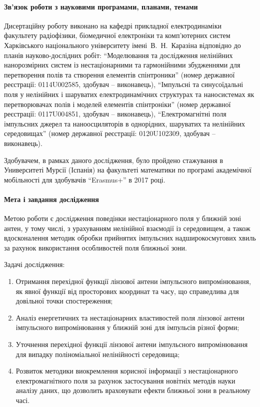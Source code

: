 \paragraph{Зв'язок роботи з науковими програмами, планами, темами}

Дисертаційну роботу виконано на кафедрі прикладної електродинаміки факультету 
радіофізики, біомедичної електроніки та комп’ютерних систем Харківського 
національного університету імені~В.~Н.~Каразіна відповідно до планів 
науково-дослідних робіт: ``Моделювання та дослідження 
нелінійних нанорозмірних систем із нестаціонарними та гармонійними 
збудженнями для перетворення полів та створення елементів спінтроники'' 
(номер державної реєстрації: 0114U002585, здобувач -- виконавець), 
``Імпульсні та синусоїдальні поля у нелінійних і шаруватих електродинамічних 
структурах та наносистемах як перетворювачах полів і моделей елементів 
спінтроніки'' (номер державної реєстрації: 0117U004851, здобувач -- виконавець),
``Електромагнітні поля імпульсних джерел та наноосциляторів в однорідних, 
шаруватих та нелінійних середовищах'' (номер державної реєстрації: 0120U102309, 
здобувач -- виконавець).

Здобувачем, в рамках даного дослідження, було пройдено стажування в 
Университеті Мурсії (Іспанія) на факультеті математики по програмі 
академічної мобільності для здобувачів ``Erasmus+'' в 2017 році.

\paragraph{Мета і завдання дослідження}

Метою роботи є дослідження поведінки нестаціонарного поля у ближній зоні антен, 
у тому числі, з урахуванням нелінійної взаємодії із середовищем, а також 
вдосконалення методик обробки прийнятих імпульсних надширокосмугових хвиль за 
рахунок використання особливостей поля ближньої зони.

Задачі дослідження:

\begin{enumerate}

\item Отримання перехідної функції лінзової антени імпульсного 
випромінювання, як явної функції від просторових координат та часу, що 
справедлива для довільної точки спостереження;

\item Аналіз енергетичних та нестаціонарних властивостей поля лінзової антени 
імпульсного випромінювання у ближній зоні для імпульсів різної форми;

\item Уточнення перехідної функції лінзової антени імпульсного 
випромінювання для випадку поліноміальної нелінійності середовища;

\item Розвиток методики виокремлення корисної інформації з нестаціонарного 
електромагнітного поля за рахунок застосування новітніх методів науки аналізу 
даних, що дозволить враховувати ефекти ближньої зони в реальному часі.

\end{enumerate}

